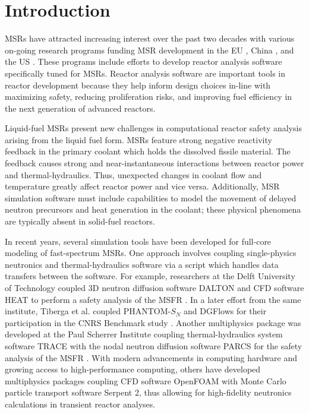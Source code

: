 \section{Introduction} \label{sec:intro}

\glspl{MSR} have attracted increasing interest over the past two
decades with various on-going research programs funding \gls{MSR} development
in the EU \citep{cordis_severe_nodate}, China \citep{dai_17_2017}, and the US
\citep{doe_office_2021}. These programs include efforts to develop
reactor analysis software specifically tuned for \glspl{MSR}. Reactor
analysis software are important tools in reactor development because
they help inform design choices in-line with
maximizing safety, reducing proliferation risks, and improving fuel
efficiency in the next generation of advanced reactors.

Liquid-fuel \glspl{MSR} present new challenges in computational reactor
safety analysis arising from the liquid fuel form. \glspl{MSR} feature strong
negative reactivity feedback in the primary coolant which holds the dissolved
fissile material. The feedback causes strong and near-instantaneous
interactions between reactor power and thermal-hydraulics. Thus,
unexpected changes in coolant flow and temperature greatly affect reactor
power and vice versa. Additionally, \gls{MSR} simulation software must include
capabilities to model the movement of delayed neutron precursors
and heat generation in the coolant; these physical phenomena are typically
absent in solid-fuel reactors.

In recent years, several simulation tools have been developed for full-core
modeling of fast-spectrum \glspl{MSR}. One approach involves coupling
single-physics neutronics and thermal-hydraulics software via a script which
handles data transfers between the software. For example, researchers at
the Delft University of Technology coupled 3D neutron diffusion software
DALTON \citep{boer_validation_2010} and CFD software HEAT
\citep{de_zwaan_static_2007} to perform a safety analysis of the \gls{MSFR}
\citep{fiorina_modelling_2014}. In a later effort from the same institute,
Tiberga et al. coupled PHANTOM-$S_N$ and DGFlows
\citep{tiberga_discontinuous_2019} for their participation in the
CNRS Benchmark study \citep{tiberga_results_2020}. Another multiphysics
package was developed at the Paul Scherrer Institute coupling
thermal-hydraulics system software TRACE \citep{nrc_trace_2007} with the nodal
neutron diffusion software PARCS \citep{downar_parcs_2010} for the safety
analysis of the \gls{MSFR} \citep{pettersen_coupled_2016}. With modern
advancements in computing hardware and growing access to high-performance
computing, others \citep{laureau_transient_2017,blanco_neutronic_2020} have
developed multiphysics packages coupling CFD software
OpenFOAM with Monte Carlo particle transport software Serpent 2, thus allowing
for high-fidelity neutronics calculations in transient reactor analyses.

